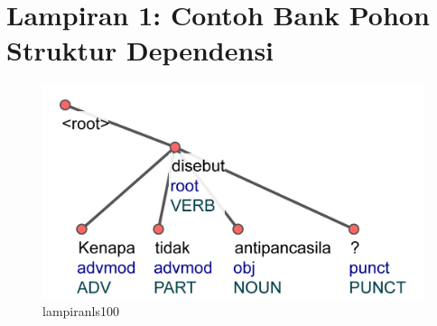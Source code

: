 \chapter*{Lampiran 1: Contoh Bank Pohon Struktur Dependensi}


\begin{figure}
	\centering \includegraphics[width=0.8
	\textwidth] {pics/lampiran/lampiranls100.jpg} 
	\caption{lampiranls100} 
	\label{fig:lampiranls100} 
\end{figure}

